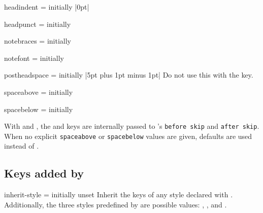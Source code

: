 \documentclass{ltxdoc}
\newcommand{\ttbraces}[1]{\braces{\texttt{#1}}}
\begin{document}
\begin{docKey}{headindent}
  {=}
  {initially |0pt|}

\end{docKey}

\begin{docKey}{headpunct}
  {=}
  {initially \ttbraces{.}}

\end{docKey}

\begin{docKey}{notebraces}
  {=}
  {initially \ttbraces{(}\ttbraces{)}}

\end{docKey}

\begin{docKey}{notefont}
  {=}
  {initially }

\end{docKey}

\begin{docKey}{postheadspace}
  {=}
  {initially |5pt plus 1pt minus 1pt|}
Do not use this with the  key.
\end{docKey}

\begin{docKey}{spaceabove}
  {=}
  {initially }

\end{docKey}

\begin{docKey}{spacebelow}
  {=}
  {initially }

\end{docKey}

\begin{notebox}
With  and , the  and  keys are internally passed to 's \texttt{before skip} and \texttt{after skip}. When no explicit \texttt{spaceabove} or \texttt{spacebelow} values are given,  defaults are used instead of .
\end{notebox}

\subsection{Keys added by }

\begin{docKey}{inherit-style}
  {=}
  {initially unset}
Inherit the keys of any style declared with .
Additionally, the three styles predefined by  are possible values: , , and .
\end{docKey}
\end{document}
